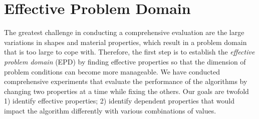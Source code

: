 
\section{Effective Problem Domain}
The greatest challenge in conducting a comprehensive evaluation are the large variations in shapes and material properties, which result in a problem domain that is too large to cope with. Therefore, the first step is to establish the \textit{effective problem domain} (EPD) by finding effective properties so that the dimension of problem conditions can become more manageable. We have conducted comprehensive experiments that evaluate the performance of the algorithms by changing two properties at a time while fixing the others. Our goals are twofold 1) identify effective properties; 2) identify dependent properties that would impact the algorithm differently with various combinations of values.

